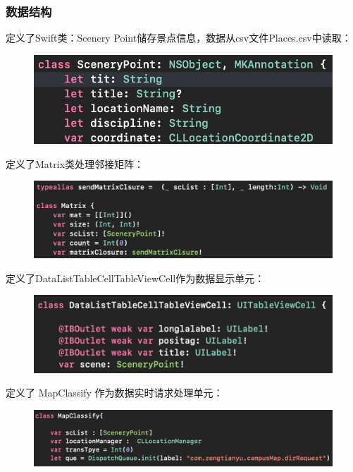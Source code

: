 \documentclass[12pt,UTF8]{ctexart}
\begin{document}
\begin{spacing}{1.4}
\subsubsection{数据结构}
定义了Swift类：Scenery Point储存景点信息，数据从csv文件Places.csv中读取：
\begin{figure}[H]
\centering
\includegraphics[width=0.5\linewidth]{fig/scenery_point.png}
\end{figure}
定义了Matrix类处理邻接矩阵：
\begin{figure}[H]
\centering
\includegraphics[width=0.5\linewidth]{fig/matrix.png}
\end{figure}
定义了DataListTableCellTableViewCell作为数据显示单元：
\begin{figure}[H]
\centering
\includegraphics[width=0.5\linewidth]{fig/datalisttable.png}
\end{figure}
定义了 MapClassify 作为数据实时请求处理单元：
\begin{figure}[H]
\centering
\includegraphics[width=0.5\linewidth]{fig/mapclassify.png}
\end{figure}


\end{spacing}
\end{document}
